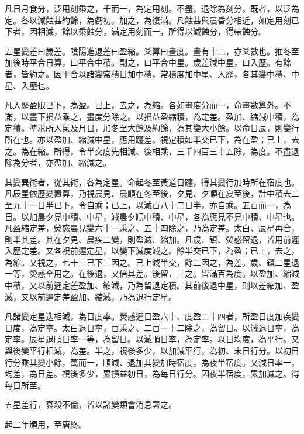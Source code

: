 \begin{pinyinscope}
 凡日月食分，泛用刻乘之，千而一，為定用刻。不盡，退除為刻分。既者，以泛為定。各以減蝕甚約餘，為虧初。加之，為復滿。凡蝕甚與晨昏分相近，如定用刻已下者，因相減，餘以乘蝕分，滿定用刻而一，所得以減蝕分，得帶蝕分。



 五星變差曰歲差。陰陽進退差曰盈縮。爻算曰畫度。畫有十二，亦爻數也。推冬至加後時平合日算，曰平合中積。副之，曰平合中星。歲差減中星，曰入歷。有餘者，皆約之。因平合以諸變常積日加中積，常積度加中星、入歷，各其變中積、中星、入歷也。



 凡入歷盈限已下，為盈。已上，去之，為縮。各如畫度分而一，命畫數算外。不滿，以畫下損益乘之，畫度分除之。以損益盈縮積，為定差。盈加、縮減中積，為定積。準求所入氣及月日，加冬至大餘及約餘，為其變大小餘。以命日辰，則變行所在也。亦以盈加、縮減中星，應用躔差。視定積如半交已下，為在盈；已上，去之。為在縮。所得，令半交度先相減、後相乘，三千四百三十五除，為度。不盡退除為分者，亦盈加、縮減之。



 其變異術者，從其術，各為定星。命起冬至黃道日躔，得其變行加時所在宿度也。凡辰星依歷變置算，乃視晨見、晨順在冬至後，夕見、夕順在夏至後，計中積去二至九十一日半已下，令自乘；已上，以減百八十二日半，亦自乘。五百而一，為日。以加晨夕見中積、中星，減晨夕順中積、中星，各為應見不見中積、中星也。凡盈縮定差，熒惑晨見變六十一乘之、五十四除之，乃為定差。太白、辰星再合，則半其差。其在夕見、晨疾二變，則盈減、縮加。凡歲、鎮、熒惑留退，皆用前遲入歷定差。又各視前遲定星，以變下減度減之。餘半交已下，為盈；已上，去之，為縮。又視之，七十三已下三因之。已上減半交，餘二因之，為差。歲、鎮二星退一等，熒惑全用之。在後退，又倍其差。後留，三之。皆滿百為度。以盈加、縮減中積，又以前遲定差盈加、縮減，乃為留退定積。其前後退中星，則以差縮加、盈減，又以前遲定差盈加、縮減，乃為退行定星。



 凡諸變定星迭相減，為日度率。熒惑遲日盈六十、度盈二十四者，所盈日度加疾變日度，為定率。太白退日率，百乘之、二百一十二除之，為留日。以減退日率，為定率。辰星退順日率一等，為留日。以減順日率，為定率。以日均度，為平行。又與後變平行相減，為差。半之，視後多少，以加減平行，為初、末日行分。以初日行分乘其變小餘，萬而一，順減、退加其變加時宿度，為夜半宿度。又減日率一，均差，為日差。視後多少，累損益初日，為每日行分。因夜半宿度，累加減之。得每日所至。



 五星差行，衰殺不倫，皆以諸變類會消息署之。



 起二年頒用，至唐終。




\end{pinyinscope}
